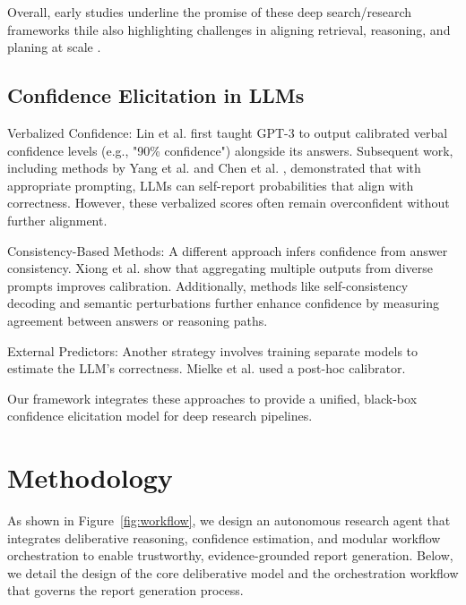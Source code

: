 \documentclass[11pt]{article}
\begin{document}
Overall, early studies underline the promise of these deep search/research frameworks thile also highlighting challenges in aligning retrieval, reasoning, and planing at scale \cite{liang2025reasoning}.

\subsection{Confidence Elicitation in LLMs}

Verbalized Confidence: Lin et al. \cite{lin2022teaching} first taught GPT-3 to output calibrated verbal confidence levels (e.g., "90\% confidence") alongside its answers. Subsequent work, including methods by Yang et al. \cite{yang2024verbalized} and Chen et al. \cite{chen2023quantifying}, demonstrated that with appropriate prompting, LLMs can self-report probabilities that align with correctness. However, these verbalized scores often remain overconfident without further alignment.

Consistency-Based Methods: A different approach infers confidence from answer consistency. Xiong et al. \cite{xiong2023can} show that aggregating multiple outputs from diverse prompts improves calibration. Additionally, methods like self-consistency decoding \cite{taubenfeld2025confidence} and semantic perturbations \cite{lyu2025calibrating} further enhance confidence by measuring agreement between answers or reasoning paths.

External Predictors: Another strategy involves training separate models to estimate the LLM’s correctness. Mielke et al. \cite{mielke2022reducing} used a post-hoc calibrator.

Our framework integrates these approaches to provide a unified, black-box confidence elicitation model for deep research pipelines.


\section{Methodology}
As shown in Figure~\ref{fig:workflow}, we design an autonomous research agent that integrates deliberative reasoning, confidence estimation, and modular workflow orchestration to enable trustworthy, evidence-grounded report generation. Below, we detail the design of the core deliberative model and the orchestration workflow that governs the report generation process.
\end{document}
